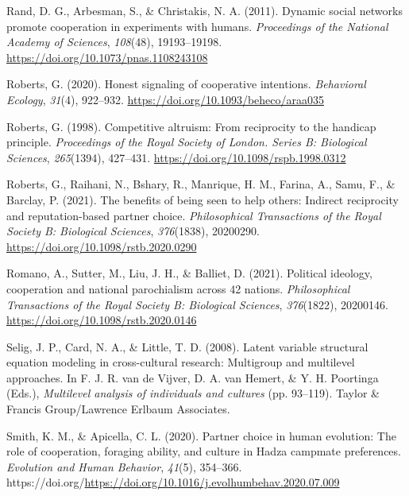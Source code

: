 \documentclass[
  man,floatsintext]{apa6}
\newlength{\cslhangindent}
\newlength{\cslentryspacingunit} %
\newenvironment{CSLReferences}[2] %
 {%
  \setlength{\parindent}{0pt}
  \ifodd #1
  \let\oldpar\par
  \def\par{\hangindent=\cslhangindent\oldpar}
  \fi
  \setlength{\parskip}{#2\cslentryspacingunit}
 }%
 {}
\begin{document}
\begin{CSLReferences}{1}{0}
\leavevmode{}%
Rand, D. G., Arbesman, S., \& Christakis, N. A. (2011). Dynamic social networks promote cooperation in experiments with humans. \emph{Proceedings of the National Academy of Sciences}, \emph{108}(48), 19193--19198. \url{https://doi.org/10.1073/pnas.1108243108}

\leavevmode{}%
Roberts, G. (2020). Honest signaling of cooperative intentions. \emph{Behavioral Ecology}, \emph{31}(4), 922--932. \url{https://doi.org/10.1093/beheco/araa035}

\leavevmode{}%
Roberts, G. (1998). Competitive altruism: From reciprocity to the handicap principle. \emph{Proceedings of the Royal Society of London. Series B: Biological Sciences}, \emph{265}(1394), 427--431. \url{https://doi.org/10.1098/rspb.1998.0312}

\leavevmode{}%
Roberts, G., Raihani, N., Bshary, R., Manrique, H. M., Farina, A., Samu, F., \& Barclay, P. (2021). The benefits of being seen to help others: Indirect reciprocity and reputation-based partner choice. \emph{Philosophical Transactions of the Royal Society B: Biological Sciences}, \emph{376}(1838), 20200290. \url{https://doi.org/10.1098/rstb.2020.0290}

\leavevmode{}%
Romano, A., Sutter, M., Liu, J. H., \& Balliet, D. (2021). Political ideology, cooperation and national parochialism across 42 nations. \emph{Philosophical Transactions of the Royal Society B: Biological Sciences}, \emph{376}(1822), 20200146. \url{https://doi.org/10.1098/rstb.2020.0146}

\leavevmode{}%
Selig, J. P., Card, N. A., \& Little, T. D. (2008). Latent variable structural equation modeling in cross-cultural research: Multigroup and multilevel approaches. In F. J. R. van de Vijver, D. A. van Hemert, \& Y. H. Poortinga (Eds.), \emph{Multilevel analysis of individuals and cultures} (pp. 93--119). Taylor \& Francis Group/Lawrence Erlbaum Associates.

\leavevmode{}%
Smith, K. M., \& Apicella, C. L. (2020). Partner choice in human evolution: The role of cooperation, foraging ability, and culture in {Hadza} campmate preferences. \emph{Evolution and Human Behavior}, \emph{41}(5), 354--366. https://doi.org/\url{https://doi.org/10.1016/j.evolhumbehav.2020.07.009}


\end{CSLReferences}
\end{document}
